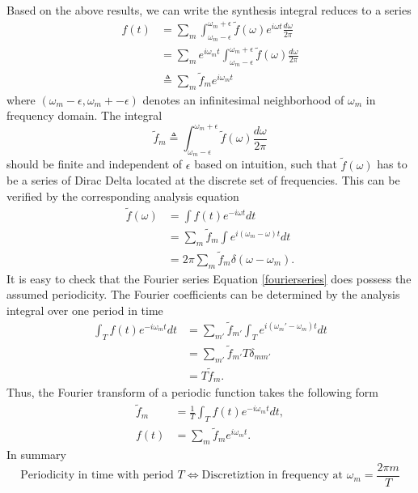 \documentclass[
10pt, %
a4paper, %
oneside, %
headinclude,footinclude, %
BCOR5mm, %
]{scrartcl}
\begin{document}
Based on the above results, we can write the synthesis integral reduces to a series
\begin{align}\label{fourierseries}
\nonumber f(t) &= \sum_{m} \int_{\omega_m -\epsilon}^{\omega_m+ \epsilon} \tilde{f}(\omega) e^{i\omega t}\frac{d\omega}{2\pi}\\
\nonumber &= \sum_{m} e^{i\omega_m t} \int_{\omega_m -\epsilon}^{\omega_m+ \epsilon} \tilde{f}(\omega) \frac{d\omega}{2\pi}\\
 &\triangleq \sum_{m} \tilde{f}_m e^{i\omega_m t}
\end{align}
where $(\omega_m -\epsilon, \omega_m +-\epsilon)$ denotes an infinitesimal neighborhood of $\omega_m$ in frequency domain. The integral 
\begin{equation}\label{fouriercomponents}
\tilde{f}_m \triangleq \int_{\omega_m -\epsilon}^{\omega_m+ \epsilon} \tilde{f}(\omega)\frac{d\omega}{2\pi}
\end{equation}
should be finite and independent of $\epsilon$ based on intuition, such that $\tilde{f}(\omega)$ has to be a series of Dirac Delta located at the discrete set of frequencies. This can be verified by the corresponding analysis equation
\begin{align}
\nonumber \tilde{f}(\omega) &= \int f(t)e^{-i\omega t}dt \\
\nonumber &= \sum_{m} \tilde{f}_m \int e^{i(\omega_m-\omega) t}dt\\
\nonumber &= 2\pi \sum_{m} \tilde{f}_m \delta(\omega - \omega_m).
\end{align}
It is easy to check that the Fourier series Equation \ref{fourierseries} does possess the assumed periodicity. The Fourier coefficients can be determined by the analysis integral over one period in time
\begin{align}
\nonumber \int_T f(t) e^{-i\omega_m t} dt &= \sum_{m'} \tilde{f}_{m'} \int_T e^{i(\omega_m'-\omega_m) t}dt \\
\nonumber &= \sum_{m'} \tilde{f}_{m'} T\delta_{mm'}\\
\nonumber &= T\tilde{f}_{m}.
\end{align}
Thus, the Fourier transform of a periodic function takes the following form
\begin{align}
\tilde{f}_{m} &= \frac{1}{T}\int_T f(t) e^{-i\omega_m t} dt, \\
f(t) &= \sum_{m} \tilde{f}_m e^{i\omega_m t}.
\end{align}
In summary
$$
\boxed{\text{Periodicity in time with period }T \Leftrightarrow \text{Discretiztion in frequency at } \omega_m = \frac{2\pi m}{T}}
$$
\end{document}
